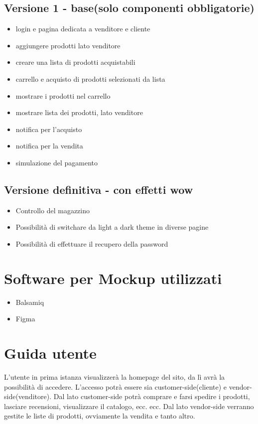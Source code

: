 \documentclass[a4paper,12pt]{report}
\begin{document}
	\subsection{Versione 1 - base(solo componenti obbligatorie)}
	\begin{itemize}
		\item login e pagina dedicata a venditore e cliente
		\item aggiungere prodotti lato venditore
		\item creare una lista di prodotti acquistabili
		\item carrello e acquisto di prodotti selezionati da lista
		\item mostrare i prodotti nel carrello
		\item mostrare lista dei prodotti, lato venditore
		\item notifica per l'acquisto
		\item notifica per la vendita
		\item simulazione del pagamento
	\end{itemize}

	\subsection{Versione definitiva - con effetti wow}
	\begin{itemize}
		\item Controllo del magazzino
		\item Possibilità di switchare da light a dark theme in diverse pagine
		\item Possibilità di effettuare il recupero della password
	\end{itemize}

	\section{Software per Mockup utilizzati}
	
	\begin{itemize}
		\item Balsamiq
		\item Figma
	\end{itemize}

	
	\newpage

	\section{Guida utente}
	L'utente in prima istanza visualizzerà la homepage del sito, da lì avrà la possibilità di accedere.
	L'accesso potrà essere sia customer-side(cliente) e vendor-side(venditore).
	Dal lato customer-side potrà comprare e farsi spedire i prodotti, lasciare recensioni, visualizzare il catalogo, ecc. ecc.
	Dal lato vendor-side verranno gestite le liste di prodotti, ovviamente la vendita e tanto altro.\\
	
\end{document}
